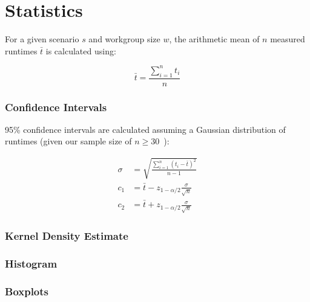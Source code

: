 


\section{Statistics}

For a given scenario $s$ and workgroup size $w$, the arithmetic mean
of $n$ measured runtimes $\bar{t}$ is calculated using:

\begin{equation}
\bar{t} = \frac{\sum_{i=1}^{n}t_i}{n}
\end{equation}

\subsubsection{Confidence Intervals}

95\% confidence intervals are calculated assuming a Gaussian
distribution of runtimes (given our sample size of
$n \ge 30$~\cite{Georges2007}):

\begin{align}
\sigma &= \sqrt{\frac{\sum_{i=1}^{n}(t_i - \bar{t})^2}{n - 1}}\\
c_1 &= \bar{t} - z_{1-\alpha/2}\frac{\sigma}{\sqrt{n}}\\
c_2 &= \bar{t} + z_{1-\alpha/2}\frac{\sigma}{\sqrt{n}}
\end{align}


\subsubsection{Kernel Density Estimate}

\subsubsection{Histogram}

\subsubsection{Boxplots}


